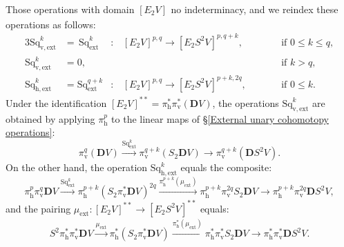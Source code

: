 \documentclass[11pt]{amsart} \renewcommand{\baselinestretch}{1.2}
\theoremstyle{plain}
\theoremstyle{definition}
\renewcommand{\to}{\longrightarrow}
\newcommand{\ExtCohOp}{\mathrm{Sq}_\mathrm{ext}}
\newcommand{\vExtCohOp}{\mathrm{Sq}_\mathrm{v,ext}}
\newcommand{\hExtCohOp}{\mathrm{Sq}_\mathrm{h,ext}}
\newcommand{\ExtCohProd}{\mu_\mathrm{ext}}
\newcommand{\Edown}[4]{[E_{#1}#2]^{#3}_{#4}}
\newcommand{\dver}{_\mathrm{v}}
\newcommand{\dhor}{_\mathrm{h}}
\newcommand{\dual}{\mathbf{D}}
\begin{document}
\begin{Operations in composite functor spectral sequences}
Those operations with domain $\Edown{2}{V}{}{}$ no indeterminacy, and we reindex these operations as follows: %
\begin{alignat*}{3}
\vExtCohOp^k&=\,\ExtCohOp^k&:\,&\Edown{2}{V}{p,q}{}\to \Edown{2}{S^2V}{p,q+k}{},&\qquad&\text{if }0\leq k \leq q,\\
\vExtCohOp^k&=0,&&&&\text{if }k > q,\\
\hExtCohOp^k&=\ExtCohOp^{q+k}&:\,&\Edown{2}{V}{p,q}{}\to \Edown{2}{S^2V}{p+k,2q}{},&\qquad&\text{if }0\leq k.
\end{alignat*}
Under the identification $\Edown{2}{V}{**}{}=\pi\dhor^{*}\pi\dver^{*}(\dual V)$, the operations $\vExtCohOp^k$ %
are  obtained by applying $\pi\dhor^p$ to the linear maps of \S\ref{External unary cohomotopy operations}:
\[\pi\dver^{q}(\dual V)\overset{\ExtCohOp^k}{\to} \pi\dver^{q+k}(S_2\dual V)\to \pi\dver^{q+k}(\dual S^2V).\]
On the other hand, the operation $\hExtCohOp^k$ equals the composite:
\[\pi\dhor^p\pi\dver^q\dual V
\overset{\ExtCohOp^k}{\to} 
\pi\dhor^{p+k}(S_2\pi\dver^*\dual V)^{2q}
\overset{\pi\dhor^{p+k}(\ExtCohProd)}{\to}
\pi\dhor^{p+k}\pi\dver^{2q}S_2\dual V
\to 
\pi\dhor^{p+k}\pi\dver^{2q}\dual S^2 V,
\]
 and the pairing $\ExtCohProd:\Edown{2}{V}{**}{}\to \Edown{2}{S^2V}{**}{}$ equals:
\[S^2\pi\dhor^*\pi\dver^*\dual V
\overset{\ExtCohProd}{\to} 
\pi\dhor^*(S_2\pi\dver^*\dual V)
\overset{\pi\dhor^{*}(\ExtCohProd)}{\to}
\pi\dhor^{*}\pi\dver^{*}S_2\dual V
\to 
\pi\dhor^{*}\pi\dver^{*}\dual S^2 V.
\]


\end{Operations in composite functor spectral sequences}
\end{document}
